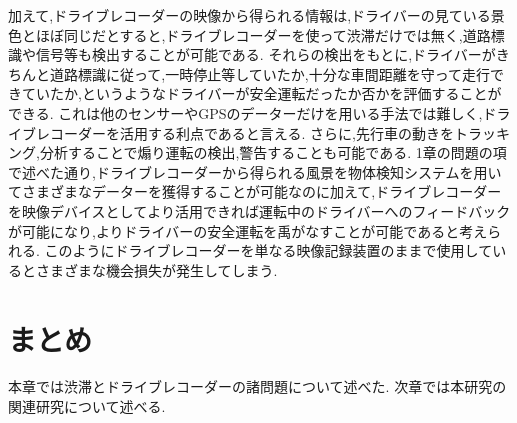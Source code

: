 加えて,ドライブレコーダーの映像から得られる情報は,ドライバーの見ている景色とほぼ同じだとすると,ドライブレコーダーを使って渋滞だけでは無く,道路標識や信号等も検出することが可能である.
それらの検出をもとに,ドライバーがきちんと道路標識に従って,一時停止等していたか,十分な車間距離を守って走行できていたか,というようなドライバーが安全運転だったか否かを評価することができる.
これは他のセンサーやGPSのデーターだけを用いる手法では難しく,ドライブレコーダーを活用する利点であると言える.
さらに,先行車の動きをトラッキング,分析することで煽り運転の検出,警告することも可能である.
1章の問題の項で述べた通り,ドライブレコーダーから得られる風景を物体検知システムを用いてさまざまなデーターを獲得することが可能なのに加えて,ドライブレコーダーを映像デバイスとしてより活用できれば運転中のドライバーへのフィードバックが可能になり,よりドライバーの安全運転を禹がなすことが可能であると考えられる.
このようにドライブレコーダーを単なる映像記録装置のままで使用しているとさまざまな機会損失が発生してしまう.


\section{まとめ}
本章では渋滞とドライブレコーダーの諸問題について述べた.
次章では本研究の関連研究について述べる.
